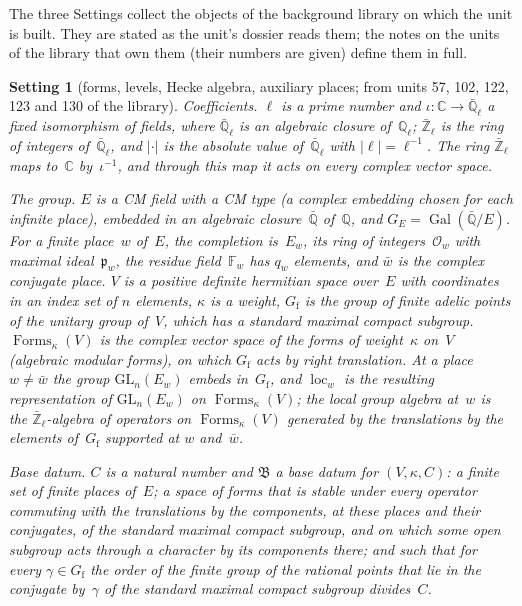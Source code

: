 \documentclass[11pt,a4paper]{article}
\newcommand{\Gal}{\operatorname{Gal}}
\newcommand{\kw}[1]{\emph{#1}}
\newcommand{\m}[1]{\mbox{$#1$}}        %
\theoremstyle{plainx}
\theoremstyle{uprightx}
\newtheorem{setting}[theorem]{Setting}          %
\newcommand{\CC}{\mathbb{C}}
\newcommand{\Zl}{\bar{\mathbb{Z}}_\ell}
\newcommand{\Ql}{\bar{\mathbb{Q}}_\ell}
\newcommand{\Qbar}{\bar{\mathbb{Q}}}
\newcommand{\GE}{G_E}
\newcommand{\Gf}{G_{\mathrm{f}}}
\newcommand{\Fw}[1]{\mathbb{F}_{#1}}
\newcommand{\Ew}[1]{E_{#1}}
\newcommand{\Ow}[1]{\mathcal{O}_{#1}}
\newcommand{\pw}[1]{\mathfrak{p}_{#1}}
\newcommand{\GL}{\mathrm{GL}}
\newcommand{\AllForms}{\operatorname{Forms}_{\kappa}(V)}
\newcommand{\fB}{\mathfrak{B}}
\newcommand{\loc}{\operatorname{loc}}
\begin{document}
The three Settings collect the objects of the background library on which the unit is built. They are stated as
the unit's dossier reads them; the notes on the units of the library that own them (their numbers are given)
define them in full.

\begin{setting}[forms, levels, Hecke algebra, auxiliary places; from units 57, 102, 122, 123 and 130 of the
library]\label{set:forms}
\emph{Coefficients.} $\ell$ is a prime number and \m{\iota\colon\CC\to\Ql} a fixed isomorphism of fields, where
$\Ql$ is an algebraic closure of~$\mathbb{Q}_\ell$; $\Zl$ is the ring of integers of~$\Ql$, and \m{|\cdot|} is the
absolute value of~$\Ql$ with \m{|\ell|=\ell^{-1}}. The ring $\Zl$ maps to~$\CC$ by~$\iota^{-1}$, and through this map
it acts on every complex vector space.

\emph{The group.} $E$ is a CM field with a CM type (a complex embedding chosen for each infinite place), embedded
in an algebraic closure~$\Qbar$ of~$\mathbb{Q}$, and \m{\GE=\Gal(\Qbar/E)}. For a finite place~$w$ of~$E$, the
completion is~$\Ew{w}$, its ring of integers~$\Ow{w}$ with maximal ideal~$\pw{w}$, the residue field~$\Fw{w}$ has
$q_w$ elements, and $\bar w$ is the complex conjugate place. $V$ is a positive definite hermitian space over~$E$
with coordinates in an index set of $n$ elements, $\kappa$ is a weight, \m{\Gf} is the group of finite adelic points
of the unitary group of~$V$, which has a standard maximal compact subgroup. \m{\AllForms} is the complex
vector space of the forms of weight~$\kappa$ on~$V$ (algebraic modular forms), on which \m{\Gf} acts by right translation.
At a place \m{w\ne\bar w} the group \m{\GL_n(\Ew{w})} embeds in~\m{\Gf}, and \m{\loc_w} is the resulting
representation of \m{\GL_n(\Ew{w})} on \m{\AllForms}; the \kw{local group algebra} at~$w$ is the $\Zl$-algebra of
operators on \m{\AllForms} generated by the translations by the elements of~\m{\Gf} supported at $w$ and~$\bar w$.

\emph{Base datum.} $C$ is a natural number and $\fB$ a \kw{base datum} for \m{(V,\kappa,C)}: a finite set of finite
places of~$E$; a space of forms that is stable under every operator commuting with the translations by the
components, at these places and their conjugates, of the standard maximal compact subgroup, and on which some open
subgroup acts through a character by its components there; and such that for every \m{\gamma\in\Gf} the order of
the finite group of the rational points that lie in the conjugate by~$\gamma$ of the standard maximal compact
subgroup divides~$C$.


\end{setting}
\end{document}
